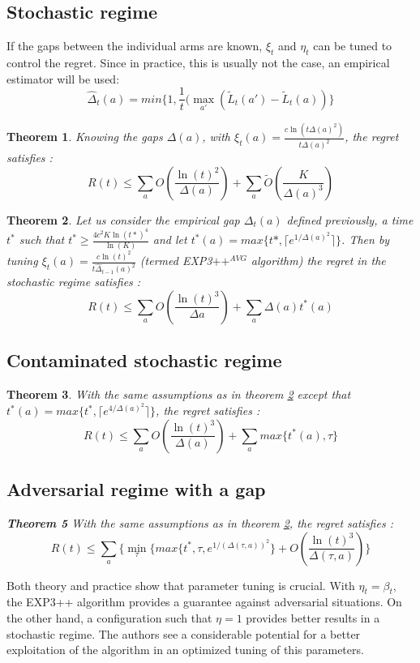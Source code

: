 \documentclass[10.5pt]{article}
\newtheorem{theorem}{Theorem}
\begin{document}
\subsection*{Stochastic regime}
If the gaps between the individual arms are known, $\xi_{t}$ and $\eta_{t}$ can be tuned to control the regret. Since in practice, this is usually not the case, an empirical estimator will be used:
$$\hat{\Delta}_{t}(a)=min\{1,\frac{1}{t}(\max_{a'}(\tilde{L}_{t}(a')-\tilde{L}_{t}(a))\}$$
\begin{theorem}
Knowing the gaps $\Delta(a)$, with $\xi_{t}(a)=\frac{c\ln(t\Delta(a)^{2})}{t\Delta(a)^{2}}$, the regret satisfies :
$$R(t) \leq \sum_{a} O(\frac{\ln(t)^{2}}{\Delta(a)})+\sum_{a}\tilde{O}(\frac{K}{\Delta(a)^{3}})$$
\end{theorem}

\begin{theorem} \label{stoch}
Let us consider the empirical gap $\Delta_{t}(a)$ defined previously, a time $t^{*}$ such that $t^{*}\geq \frac{4c^{2}K\ln(t*)^{4}}{\ln(K)}$ and let $t^{*}(a)=max\{t*,\lceil e^{1/\Delta(a)^{2}}\rceil\}$.
Then by tuning $\xi_{t}(a)=\frac{c\ln(t)^{2}}{t\hat{\Delta}_{t-1}(a)^{2}}$ (termed EXP3$++^{AVG}$ algorithm) the regret in the stochastic regime satisfies :
$$R(t) \leq \sum_{a}O(\frac{\ln(t)^{3}}{\Delta{a}})+\sum_{a}\Delta(a)t^{*}(a)$$
\end{theorem}

\subsection*{Contaminated stochastic regime}

\begin{theorem}
With the same assumptions as in theorem \ref{stoch} except that $t^{*}(a)=max\{t^{*}, \lceil e^{4/\Delta(a)^{2}}\rceil \}$, the regret satisfies :
$$R(t) \leq \sum_{a}O(\frac{\ln(t)^{3}}{\Delta(a)})+\sum_{a}max\{t^{*}(a),\tau\}$$

\subsection*{Adversarial regime with a gap}
\textbf{Theorem 5} With the same assumptions as in theorem \ref{stoch}, the regret satisfies :
$$R(t) \leq \sum_{a}\{\min_{\tau}\{max\{t^{*},\tau,e^{1/(\Delta(\tau,a))^{2}}\}+O(\frac{\ln(t)^{3}}{\Delta(\tau,a)})\}$$
\end{theorem}

Both theory and practice show that parameter tuning is crucial. With $\eta_{t}=\beta_{t}$, the EXP3++ algorithm provides a guarantee against adversarial situations. On the other hand, a configuration such that $\eta=1$ provides better results in a stochastic regime. The authors see a considerable potential for a better exploitation of the algorithm in an optimized tuning of this parameters.
\end{document}
